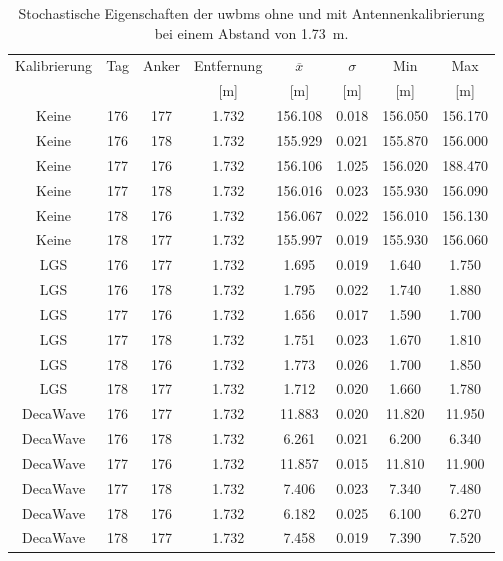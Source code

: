\begin{table}[h]
	\centering
	\begin{tabular}{||c||cc||ccc|cc||}
\hline
Kalibrierung & Tag & Anker & Entfernung & $\overline{x}$ & $\sigma$ & Min & Max \\
 & & & [\si{\meter}] & [\si{\meter}] & [\si{\meter}] & [\si{\meter}] & [\si{\meter}] \\
\hline
\hline
Keine & 176 & 177 & \num{1.732} & \num{156.108} & \num{0.018} & \num{156.050} & \num{156.170} \\
Keine & 176 & 178 & \num{1.732} & \num{155.929} & \num{0.021} & \num{155.870} & \num{156.000} \\
Keine & 177 & 176 & \num{1.732} & \num{156.106} & \num{1.025} & \num{156.020} & \num{188.470} \\
Keine & 177 & 178 & \num{1.732} & \num{156.016} & \num{0.023} & \num{155.930} & \num{156.090} \\
Keine & 178 & 176 & \num{1.732} & \num{156.067} & \num{0.022} & \num{156.010} & \num{156.130} \\
Keine & 178 & 177 & \num{1.732} & \num{155.997} & \num{0.019} & \num{155.930} & \num{156.060} \\
\hline
LGS & 176 & 177 & \num{1.732} & \num{1.695} & \num{0.019} & \num{1.640} & \num{1.750} \\
LGS & 176 & 178 & \num{1.732} & \num{1.795} & \num{0.022} & \num{1.740} & \num{1.880} \\
LGS & 177 & 176 & \num{1.732} & \num{1.656} & \num{0.017} & \num{1.590} & \num{1.700} \\
LGS & 177 & 178 & \num{1.732} & \num{1.751} & \num{0.023} & \num{1.670} & \num{1.810} \\
LGS & 178 & 176 & \num{1.732} & \num{1.773} & \num{0.026} & \num{1.700} & \num{1.850} \\
LGS & 178 & 177 & \num{1.732} & \num{1.712} & \num{0.020} & \num{1.660} & \num{1.780} \\
\hline
DecaWave & 176 & 177 & \num{1.732} & \num{11.883} & \num{0.020} & \num{11.820} & \num{11.950} \\
DecaWave & 176 & 178 & \num{1.732} & \num{6.261} & \num{0.021} & \num{6.200} & \num{6.340} \\
DecaWave & 177 & 176 & \num{1.732} & \num{11.857} & \num{0.015} & \num{11.810} & \num{11.900} \\
DecaWave & 177 & 178 & \num{1.732} & \num{7.406} & \num{0.023} & \num{7.340} & \num{7.480} \\
DecaWave & 178 & 176 & \num{1.732} & \num{6.182} & \num{0.025} & \num{6.100} & \num{6.270} \\
DecaWave & 178 & 177 & \num{1.732} & \num{7.458} & \num{0.019} & \num{7.390} & \num{7.520} \\
\hline
	\end{tabular}
	\caption[Stochastische Eigenschaften der \Glspl{uwbm} ohne und mit Antennenkalibrierung bei einem Abstand von \SI{1.73}{\meter}.]{Stochastische Eigenschaften der \Glspl{uwbm} ohne und mit Antennenkalibrierung bei einem Abstand von \SI{1.73}{\meter}.\footnotemark}
	\label{tab:calibration_range_results}
\end{table}

